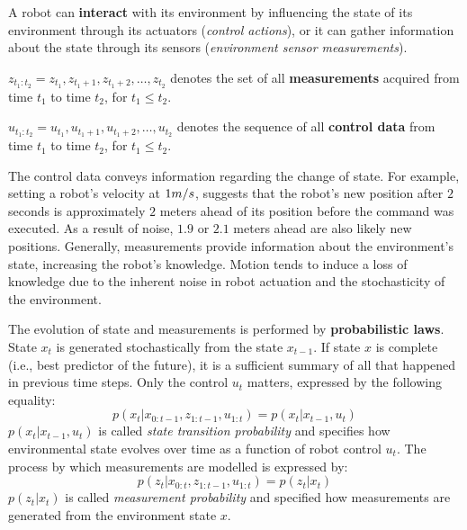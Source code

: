 A robot can \textbf{interact} with its environment by influencing the state of its environment through its actuators (\textit{control actions}), or it can gather information about the state through its sensors (\textit{environment sensor measurements}).
\begin{mydef}
$z_{t_1:t_2} = z_{t_1}, z_{t_1 + 1}, z_{t_1 + 2}, \hdots, z_{t_2}$ denotes the set of all \textbf{measurements} acquired from time $t_1$ to time $t_2$, for $t_1 \leq t_2$.
\end{mydef}
\begin{mydef}
$u_{t_1:t_2} = u_{t_1}, u_{t_1 + 1}, u_{t_1 + 2}, \hdots, u_{t_2}$ denotes the sequence of all \textbf{control data} from time $t_1$ to time $t_2$, for $t_1 \leq t_2$.
\end{mydef}
The control data conveys information regarding the change of state.
For example, setting a robot's velocity at $1 \small{m/s}$, suggests that the robot's new position after $2$ seconds is approximately $2$ meters ahead of its position before the command was executed.
As a result of noise, $1.9$ or $2.1$ meters ahead are also likely new positions.
Generally, measurements provide information about the environment's state, increasing the robot's knowledge.
Motion tends to induce a loss of knowledge due to the inherent noise in robot actuation and the stochasticity of the environment.

The evolution of state and measurements is performed by \textbf{probabilistic laws}.
State $x_t$ is generated stochastically from the state $x_{t-1}$.
If state $x$ is complete (i.e., best predictor of the future), it is a sufficient summary of all that happened in previous time steps.
Only the control $u_t$ matters, expressed by the following equality:
\begin{equation}
\label{eq:background_state_trans_prob}
p(x_t | x_{0:t - 1}, z_{1:t - 1}, u_{1:t}) = p(x_t | x_{t-1}, u_t)
\end{equation}
$p(x_t | x_{t-1}, u_t)$ is called \textit{state transition probability} and specifies how environmental state evolves over time as a function of robot control $u_t$.
The process by which measurements are modelled is expressed by:
\begin{equation}
\label{eq:background_measurement_prob}
p(z_t | x_{0:t}, z_{1:t-1}, u_{1:t}) = p(z_t | x_t)
\end{equation}
$p(z_t | x_t)$ is called \textit{measurement probability} and specified how measurements are generated from the environment state $x$.

